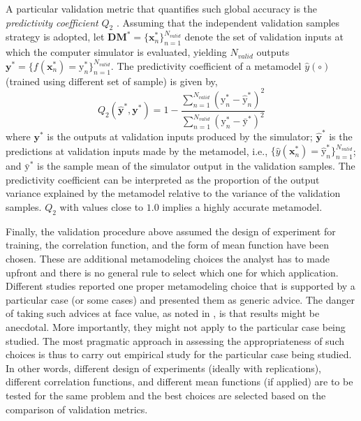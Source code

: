 A particular validation metric that quantifies such global accuracy is the \emph{predictivity coefficient} $Q_2$ \cite{Iooss2010}.
Assuming that the independent validation samples strategy is adopted, 
let $\mathbf{DM}^* = \{\mathbf{x}^*_n\}_{n=1}^{N_{valid}}$ denote the set of validation inputs at which the computer simulator is evaluated, 
yielding $N_{valid}$ outputs $\mathbf{y}^* = \{f(\mathbf{x}^*_n) = \text{y}^*_n\}_{n=1}^{N_{valid}}$.
The predictivity coefficient of a metamodel $\hat{y} (\circ)$ (trained using different set of sample) is given by, 
\begin{equation}
	Q_2 (\hat{\mathbf{y}}^*, \mathbf{y}^*) = 1 - \frac{\sum_{n=1}^{N_{valid}} (\text{y}^*_n - \hat{\text{y}}^*_n)^2}{\sum_{n=1}^{N_{valid}} (\text{y}^*_n - \bar{\text{y}}^*)^2}
\label{eq:predictivity_coefficient}
\end{equation} 
where $\mathbf{y}^*$ is the outputs at validation inputs produced by the simulator;
$\hat{\mathbf{y}}^*$ is the predictions at validation inputs made by the metamodel, i.e., $\{\hat{y}(\mathbf{x}^*_n) = \hat{\text{y}}^*_n\}_{n=1}^{N_{valid}}$;
and $\bar{\text{y}}^*$ is the sample mean of the simulator output in the validation samples.
The predictivity coefficient can be interpreted as the proportion of the output variance explained by the metamodel relative to the variance of the validation samples.
$Q_2$ with values close to $1.0$ implies a highly accurate metamodel.

Finally, the validation procedure above assumed the design of experiment for training, the correlation function, and the form of mean function have been chosen.
These are additional metamodeling choices the analyst has to made upfront and there is no general rule to select which one for which application.
Different studies reported one proper metamodeling choice that is supported by a particular case (or some cases) and presented them as generic advice.
The danger of taking such advices at face value, as noted in \cite{Chen2016}, is that results might be anecdotal.
More importantly, they might not apply to the particular case being studied.
The most pragmatic approach in assessing the appropriateness of such choices is thus to carry out empirical study for the particular case being studied.
In other words, different design of experiments (ideally with replications), different correlation functions, and different mean functions (if applied) are to be tested for the same problem and the best choices are selected based on the comparison of validation metrics.

